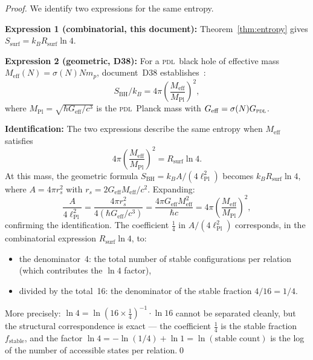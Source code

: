 \documentclass[12pt,a4paper]{article}
\newcommand{\hb}{\hbar}
\newcommand{\PDL}{\textsc{pdl}}
\newcommand{\Rsurf}{R_{\mathrm{surf}}}
\newcommand{\Ssurf}{S_{\mathrm{surf}}}
\newcommand{\SBH}{S_{\mathrm{BH}}}
\newcommand{\lPl}{\ell_{\mathrm{Pl}}}
\newcommand{\Meff}{M_{\mathrm{eff}}}
\newcommand{\MPl}{M_{\mathrm{Pl}}}
\newcommand{\sig}{\sigma}
\begin{document}
\begin{proof}
We identify two expressions for the same entropy.

\textbf{Expression 1 (combinatorial, this document):} Theorem~\ref{thm:entropy} gives $\Ssurf = k_B\Rsurf\ln 4$.

\textbf{Expression 2 (geometric, D38):} For a \PDL\ black hole of effective mass $\Meff(N) = \sig(N)N m_p$, document~D38 establishes~\cite{PDL_D38_2026}:
\begin{equation}
\SBH/k_B = 4\pi\left(\frac{\Meff}{\MPl}\right)^2,
\end{equation}
where $\MPl = \sqrt{\hb G_{\mathrm{eff}}/c^3}$ is the \PDL\ Planck mass with $G_{\mathrm{eff}} = \sig(N)G_{\PDL}$.

\textbf{Identification:} The two expressions describe the same entropy when $\Meff$ satisfies
\begin{equation}
4\pi\left(\frac{\Meff}{\MPl}\right)^2 = \Rsurf\ln 4.
\label{eq:mass_condition}
\end{equation}
At this mass, the geometric formula $\SBH = k_B A/(4\lPl^2)$ becomes $k_B\Rsurf\ln 4$, where $A = 4\pi r_s^2$ with $r_s = 2G_{\mathrm{eff}}\Meff/c^2$. Expanding:
\begin{equation}
\frac{A}{4\lPl^2} = \frac{4\pi r_s^2}{4(\hb G_{\mathrm{eff}}/c^3)} = \frac{4\pi G_{\mathrm{eff}}\Meff^2}{\hb c} = 4\pi\left(\frac{\Meff}{\MPl}\right)^2,
\end{equation}
confirming the identification. The coefficient $\tfrac{1}{4}$ in $A/(4\lPl^2)$ corresponds, in the combinatorial expression $\Rsurf\ln 4$, to:
\begin{itemize}[leftmargin=2em]
\item the denominator~4: the total number of stable configurations per relation (which contributes the $\ln 4$ factor),
\item divided by the total~16: the denominator of the stable fraction $4/16 = 1/4$.
\end{itemize}
More precisely: $\ln 4 = \ln(16 \times \tfrac{1}{4})^{-1} \cdot \ln 16$ cannot be separated cleanly, but the structural correspondence is exact — the coefficient $\tfrac{1}{4}$ is the stable fraction~$f_{\mathrm{stable}}$, and the factor $\ln 4 = -\ln(1/4) + \ln 1 = \ln(\text{stable count})$ is the log of the number of accessible states per relation.\qed
\end{proof}
\end{document}
